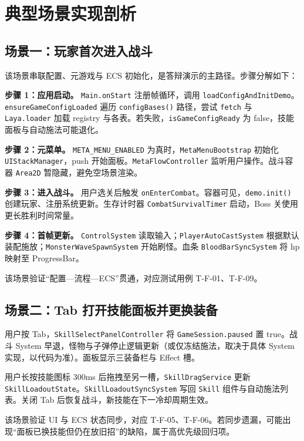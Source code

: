 ﻿
\section{典型场景实现剖析}

\subsection{场景一：玩家首次进入战斗}

该场景串联配置、元游戏与 ECS 初始化，是答辩演示的主路径。步骤分解如下：

\textbf{步骤 1：应用启动。} \texttt{Main.onStart} 注册帧循环，调用 \texttt{loadConfigAndInitDemo}。\texttt{ensureGameConfigLoaded} 遍历 \texttt{configBases()} 路径，尝试 \texttt{fetch} 与 \texttt{Laya.loader} 加载 registry 与各表。若失败，\texttt{isGameConfigReady} 为 false，技能面板与自动施法可能退化。

\textbf{步骤 2：元菜单。} \texttt{META\_MENU\_ENABLED} 为真时，\texttt{MetaMenuBootstrap} 初始化 \texttt{UIStackManager}，push 开始面板。\texttt{MetaFlowController} 监听用户操作。战斗容器 \texttt{Area2D} 暂隐藏，避免空场景渲染。

\textbf{步骤 3：进入战斗。} 用户选关后触发 \texttt{onEnterCombat}。容器可见，\texttt{demo.init()} 创建玩家、注册系统更新。生存计时器 \texttt{CombatSurvivalTimer} 启动，Boss 关使用更长胜利时间常量。

\textbf{步骤 4：首帧更新。} \texttt{ControlSystem} 读取输入；\texttt{PlayerAutoCastSystem} 根据默认装配施放；\texttt{MonsterWaveSpawnSystem} 开始刷怪。血条 \texttt{BloodBarSyncSystem} 将 hp 映射至 ProgressBar。

该场景验证“配置—流程—ECS”贯通，对应测试用例 T-F-01、T-F-09。

\subsection{场景二：Tab 打开技能面板并更换装备}

用户按 Tab，\texttt{SkillSelectPanelController} 将 \texttt{GameSession.paused} 置 true。战斗 System 早退，怪物与子弹停止逻辑更新（或仅冻结施法，取决于具体 System 实现，以代码为准）。面板显示三装备栏与 Effect 槽。

用户长按技能图标 300ms 后拖拽至另一槽，\texttt{SkillDragService} 更新 \texttt{SkillLoadoutState}。\texttt{SkillLoadoutSyncSystem} 写回 \texttt{Skill} 组件与自动施法列表。关闭 Tab 后恢复战斗，新技能在下一冷却周期生效。

该场景验证 UI 与 ECS 状态同步，对应 T-F-05、T-F-06。若同步遗漏，可能出现“面板已换技能但仍在放旧招”的缺陷，属于高优先级回归项。

